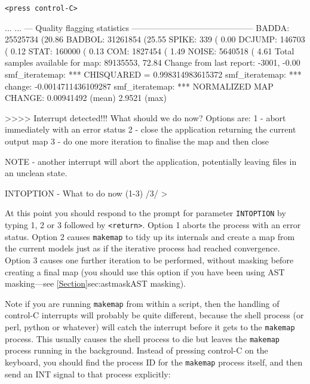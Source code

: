 \begin{terminalv}
\texttt{<press control-C>}

\begin{terminalv}
...
...
--- Quality flagging statistics
--------------------------------------------
 BADDA:   25525734 (20.86%
BADBOL:   31261854 (25.55%
 SPIKE:        339 ( 0.00%
DCJUMP:     146703 ( 0.12%
  STAT:     160000 ( 0.13%
   COM:    1827454 ( 1.49%
 NOISE:    5640518 ( 4.61%
Total samples available for map:   89135553, 72.84%
     Change from last report:      -3001, -0.00%
smf_iteratemap: *** CHISQUARED = 0.998314983615372
smf_iteratemap: *** change: -0.0014711436109287
smf_iteratemap: *** NORMALIZED MAP CHANGE: 0.00941492 (mean) 2.9521 (max)


>>>> Interrupt detected!!! What should we do now? Options are:
1 - abort immediately with an error status
2 - close the application returning the current output map
3 - do one more iteration to finalise the map and then close

NOTE - another interrupt will abort the application, potentially leaving
files in an unclean state.

INTOPTION - What to do now (1-3) /3/ >
\end{terminalv}

At this point you should respond to the prompt for parameter
\texttt{INTOPTION} by typing 1, 2 or 3 followed by \texttt{<return>}. Option
1 aborts the process with an error status. Option 2
 causes \texttt{makemap} to tidy up its internals and create a map
from the current models just as if the iterative process had reached
convergence. Option 3 causes one further iteration to be performed,
without masking before creating a final map
(you should use this option if you have been using AST
masking---see \cref{Section}{sec:astmask}{AST masking}).

\begin{tip}
Note if you are running \texttt{makemap} from within a script, then the
handling of control-C interrupts will probably be quite different, because
the shell process (or perl, python or whatever) will catch the interrupt
before it gets to the \texttt{makemap} process. This usually causes the
shell process to die but leaves the \texttt{makemap} process running in
the background. Instead of pressing control-C on the keyboard, you should
find the process ID for the \texttt{makemap} process itself, and then send an
INT signal to that process explicitly:


\end{tip}
\end{terminalv}
